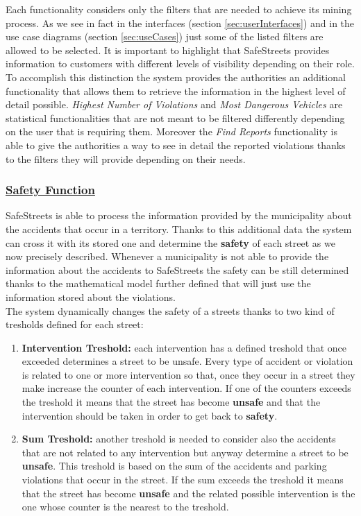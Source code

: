 		Each functionality considers only the filters that are needed to achieve its mining process. As we see in fact in the interfaces (section \ref{sec:userInterfaces}) and in the use case diagrams (section \ref{sec:useCases}) just some of the listed filters are allowed to be selected. It is important to highlight that SafeStreets provides information to customers with different levels of visibility depending on their role. To accomplish this distinction the system provides the authorities an additional functionality that allows them to retrieve the information in the highest level of detail possible. \emph{Highest Number of Violations} and \emph{Most Dangerous Vehicles} are statistical functionalities that are not meant to be filtered differently depending on the user that is requiring them. Moreover the \emph{Find Reports} functionality is able to give the authorities a way to see in detail the reported violations thanks to the filters they will provide depending on their needs.

	\subsubsection[Safety Function]{\hyperlink{toc}{Safety Function}}
		\label{sec:safetyFunction}
		SafeStreets is able to process the information provided by the municipality about the accidents that occur in a territory. Thanks to this additional data the system can cross it with its stored one and determine the \textbf{safety} of each street as we now precisely described. Whenever a municipality is not able to provide the information about the accidents to SafeStreets the safety can be still determined thanks to the mathematical model further defined that will just use the information stored about the violations. \\
		
		The system dynamically changes the safety of a streets thanks to two kind of tresholds defined for each street:
		
		\begin{enumerate}
			\item \textbf{Intervention Treshold:} each intervention has a defined treshold that once exceeded determines a street to be unsafe. Every type of accident or violation is related to one or more intervention so that, once they occur in a street they make increase the counter of each intervention. If one of the counters exceeds the treshold it means that the street has become \textbf{unsafe} and that the intervention should be taken in order to get back to \textbf{safety}.
			
			\item \textbf{Sum Treshold:} another treshold is needed to consider also the accidents that are not related to any intervention but anyway determine a street to be \textbf{unsafe}. This treshold is based on the sum of the accidents and parking violations that occur in the street. If the sum exceeds the treshold it means that the street has become \textbf{unsafe} and the related possible intervention is the one whose counter is the nearest to the treshold.
		\end{enumerate}
	
